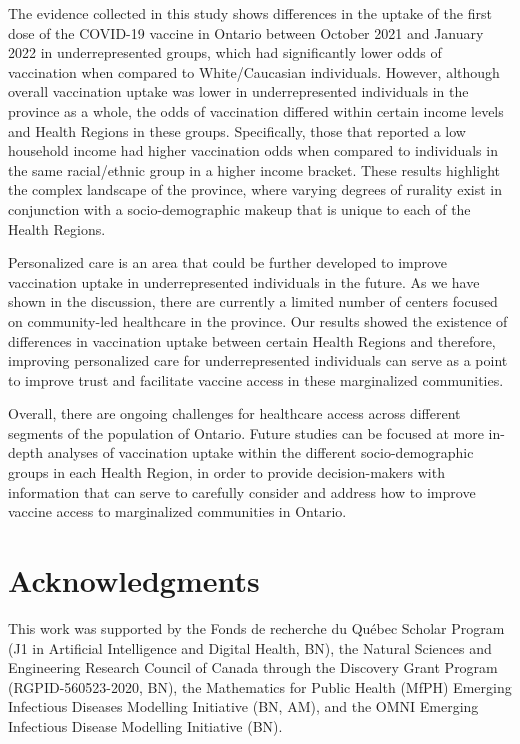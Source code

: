\documentclass[
]{article}
\begin{document}
The evidence collected in this study shows differences in the uptake of
the first dose of the COVID-19 vaccine in Ontario between October 2021
and January 2022 in underrepresented groups, which had significantly
lower odds of vaccination when compared to White/Caucasian individuals.
However, although overall vaccination uptake was lower in
underrepresented individuals in the province as a whole, the odds of
vaccination differed within certain income levels and Health Regions in
these groups. Specifically, those that reported a low household income
had higher vaccination odds when compared to individuals in the same
racial/ethnic group in a higher income bracket. These results highlight
the complex landscape of the province, where varying degrees of rurality
exist in conjunction with a socio-demographic makeup that is unique to
each of the Health Regions.

Personalized care is an area that could be further developed to improve
vaccination uptake in underrepresented individuals in the future. As we
have shown in the discussion, there are currently a limited number of
centers focused on community-led healthcare in the province. Our results
showed the existence of differences in vaccination uptake between
certain Health Regions and therefore, improving personalized care for
underrepresented individuals can serve as a point to improve trust and
facilitate vaccine access in these marginalized communities.

Overall, there are ongoing challenges for healthcare access across
different segments of the population of Ontario. Future studies can be
focused at more in-depth analyses of vaccination uptake within the
different socio-demographic groups in each Health Region, in order to
provide decision-makers with information that can serve to carefully
consider and address how to improve vaccine access to marginalized
communities in Ontario.

\hypertarget{acknowledgments}{%
\section{Acknowledgments}\label{acknowledgments}}

This work was supported by the Fonds de recherche du Québec Scholar
Program (J1 in Artificial Intelligence and Digital Health, BN), the
Natural Sciences and Engineering Research Council of Canada through the
Discovery Grant Program (RGPID-560523-2020, BN), the Mathematics for
Public Health (MfPH) Emerging Infectious Diseases Modelling Initiative
(BN, AM), and the OMNI Emerging Infectious Disease Modelling Initiative
(BN).
\end{document}
